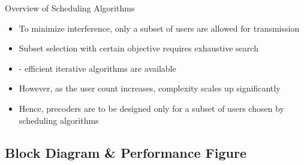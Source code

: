 \documentclass[11pt]{beamer}
\begin{document}
\begin{frame}{Overview of Scheduling Algorithms}
\begin{itemize}
	\item To minimize interference, only a subset of users are allowed for transmission
	\item Subset selection with certain objective requires exhaustive search
	\item {} - efficient iterative algorithms are available
	\item However, as the user count increases, complexity scales up significantly
	\item Hence, precoders are to be designed only for a subset of users chosen by scheduling algorithms
\end{itemize}
\end{frame}

\subsection{Block Diagram \& Performance Figure}
\end{document}
